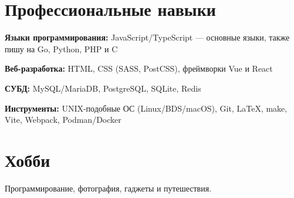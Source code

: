 \documentclass[10pt]{article}
\begin{document}

\section{Профессиональные навыки}

\begin{compactitemize}
	\item \textbf{Языки программирования:} JavaScript/TypeScript --- основные языки, также пишу на Go, Python, PHP и C
	\item \textbf{Веб-разработка:} HTML, CSS (SASS, PostCSS), фреймворки Vue и React
	\item \textbf{СУБД:} MySQL/MariaDB, PostgreSQL, SQLite, Redis
	\item \textbf{Инструменты:} UNIX-подобные ОС (Linux/BDS/macOS), Git, \LaTeX, make, Vite, Webpack, Podman/Docker
\end{compactitemize}


\section{Хобби}

Программирование, фотография, гаджеты и путешествия.





\end{document}
